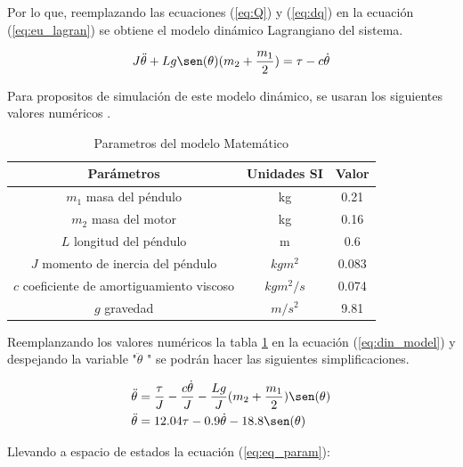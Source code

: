 \documentclass[12pt]{article}
\begin{document}
Por lo que, reemplazando las ecuaciones (\ref{eq:Q}) y (\ref{eq:dq}) en la ecuación (\ref{eq:eu_lagran}) se obtiene el modelo dinámico Lagrangiano del sistema.  

\begin{equation}
    J\ddot{\theta}+Lg\sen(\theta)(m_2+\frac{m_1}{2})=\tau-c\dot{\theta}
    \label{eq:din_model}
\end{equation}

Para propositos de simulación de este modelo dinámico, se usaran los siguientes valores numéricos \cite{taskin2017fuzzy}.

\begin{table}[h!]
    \begin{center}
        \begin{tabular}{ |c|c|c| }
            \hline
            Parámetros & Unidades SI & Valor \\ 
            \hline
            $m_1$ masa del péndulo & kg & 0.21 \\
            $m_2$ masa del motor & kg & 0.16 \\
            $L$ longitud del péndulo & m & 0.6 \\
            $J$ momento de inercia del péndulo & $kgm^2$ & 0.083 \\
            $c$ coeficiente de amortiguamiento viscoso & $kgm^2/s$ & 0.074 \\
            $g$ gravedad & $m/s^2$ & 9.81 \\
            \hline
        \end{tabular}
        \caption{\label{tab:parametros}Parametros del modelo Matemático}
    \end{center}
\end{table}

Reemplanzando los valores numéricos la tabla \ref{tab:parametros} en la ecuación (\ref{eq:din_model}) y despejando la variable "$\ddot{\theta}$ " se podrán hacer las siguientes simplificaciones.

\begin{equation}
    \begin{split}
        \ddot{\theta}&=\frac{\tau}{J}-\frac{c\dot{\theta}}{J}-\frac{Lg}{J}(m_2+\frac{m_1}{2})\sen(\theta)\\
    \ddot{\theta}&=12.04\tau-0.9\dot{\theta}-18.8\sen(\theta)
    \label{eq:eq_param}
    \end{split}
\end{equation}

Llevando a espacio de estados la ecuación (\ref{eq:eq_param}):
\end{document}
